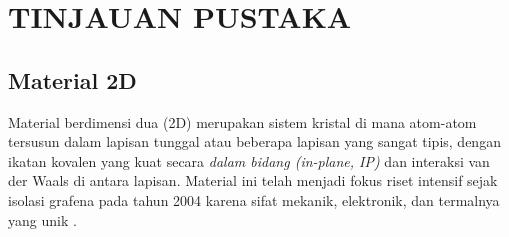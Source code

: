 \renewcommand{\thechapter}{\Roman{chapter}}
\chapter{TINJAUAN PUSTAKA}
\renewcommand{\thechapter}{\arabic{chapter}}


\section{Material 2D}
Material berdimensi dua (2D) merupakan sistem kristal di mana atom-atom tersusun dalam lapisan tunggal atau beberapa lapisan yang sangat tipis, dengan ikatan kovalen yang kuat secara \emph{dalam bidang (in-plane, IP)} dan interaksi van der Waals di antara lapisan.
Material ini telah menjadi fokus riset intensif sejak isolasi grafena pada tahun 2004 karena sifat mekanik, elektronik, dan termalnya yang unik \cite{Novoselov2004, Geim2007}.

